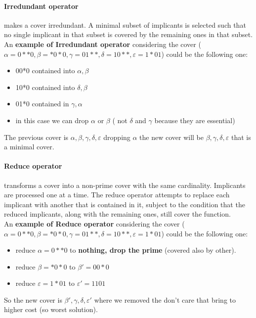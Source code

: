 \paragraph{Irredundant operator} makes a cover irredundant. A minimal subset of implicants is selected such that no single implicant in that subset is covered by the remaining ones in that subset.
\bigskip\\
An \textbf{example of Irredundant operator} considering the cover ($ \alpha=0**0, \beta=*0*0, \gamma=01**, \delta=10**, \varepsilon= 1*01 $) could be the following one:
\begin{itemize}
	\item 00*0 contained into $ \alpha, \beta $
	\item 10*0 contained into $ \delta, \beta $
	\item 01*0 contained in $ \gamma, \alpha $
	\item in this case we can drop $ \alpha $ or $ \beta $ ( not $ \delta $ and $ \gamma $ because they are essential)
\end{itemize}

The previous cover is $ \alpha, \beta, \gamma, \delta, \varepsilon $ dropping $ \alpha $ the new cover will be $ \beta, \gamma, \delta, \varepsilon $ that is a minimal cover.

\paragraph{Reduce operator} transforms a cover into a non-prime cover with the same cardinality. Implicants are processed one at a time. The reduce operator attempts to replace each implicant with another that is contained in it, subject to the condition that
the reduced implicants, along with the remaining ones, still cover the function.
\bigskip\\

An \textbf{example of Reduce operator} considering the cover ($ \alpha=0**0, \beta=*0*0, \gamma=01**, \delta=10**, \varepsilon= 1*01 $) could be the following one:
\begin{itemize}
	\item reduce $ \alpha  = 0**0 $ to \textbf{nothing, drop the prime} (covered also by other).
	\item reduce $ \beta  = *0*0 $ to $ \beta'  = 00*0 $  
	\item reduce $ \varepsilon  = 1*01 $ to $ \varepsilon'  = 1101 $
\end{itemize}

So the new cover is {$ \beta', \gamma, \delta, \varepsilon'$} where we removed the don't care that bring to higher cost (so worst solution).

